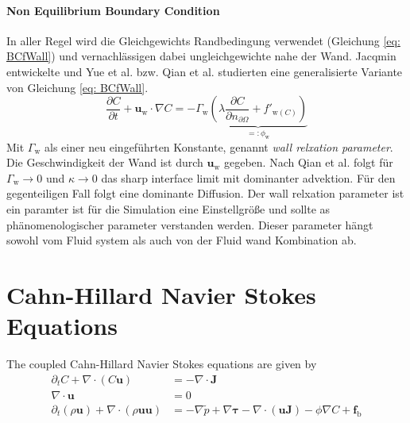 \paragraph{Non Equilibrium Boundary Condition}
In aller Regel wird die Gleichgewichts Randbedingung verwendet (Gleichung \ref{eq: BCfWall}) und vernachlässigen dabei ungleichgewichte nahe der Wand. Jacqmin \cite{jacqmin2000ContactlineDynamicsDiffuse} entwickelte und Yue et al. \cite{yue2011WallEnergyRelaxation} bzw. Qian et al. \cite{qian2006VariationalApproachMoving} studierten eine generalisierte Variante von Gleichung \ref{eq: BCfWall}.
\begin{equation}
    \frac{\partial C}{\partial t} + \mathbf{u}_{\mathrm{w}}\cdot \nabla C = -\Gamma_{\mathrm{w}} \underbrace{\left(\lambda \frac{\partial C}{\partial n_{\partial \Omega}}+f'_{\mathrm{w}(C)}\right)}_{=:\phi_{\mathrm{w}}}
\end{equation}
Mit $\Gamma_{\mathrm{w}}$ als einer neu eingeführten Konstante, genannt \textit{wall relxation parameter}. Die Geschwindigkeit der Wand ist durch $\mathbf{u}_{\mathrm{w}}$ gegeben. Nach Qian et al. \cite{qian2006VariationalApproachMoving} folgt für $\Gamma_{\mathrm{w}}\rightarrow 0$ und $\kappa\rightarrow 0$ das sharp interface limit mit dominanter advektion. Für den gegenteiligen Fall folgt eine dominante Diffusion. Der wall relxation parameter ist ein paramter ist für die Simulation eine Einstellgröße und sollte as phänomenologischer parameter verstanden werden. Dieser parameter hängt sowohl vom Fluid system als auch von der Fluid wand Kombination ab\cite{jacqmin2000ContactlineDynamicsDiffuse}.

\section{Cahn-Hillard Navier Stokes Equations}
The coupled Cahn-Hillard Navier Stokes equations are given by
\begin{align}
    \partial_t C + \nabla \cdot \left( C \mathbf{u} \right) &= -\nabla \cdot \mathbf{J} \\
    \nabla \cdot \mathbf{u} &= 0 \\
    \label{eq: NSEChanged}
    \partial_t(\rho \mathbf{u}) + \nabla \cdot (\rho \mathbf{u}\mathbf{u})&= -\nabla \tilde{p} + \nabla \mathbf{\tau} - \nabla \cdot(\mathbf{u}\mathbf{J})-\phi\nabla C + \mathbf{f}_{\mathrm{b}}
\end{align}

